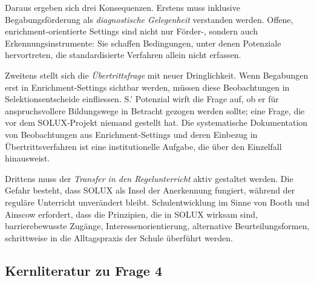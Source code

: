 \documentclass[ngerman, a4paper]{article}
\begin{document}
Daraus ergeben sich drei Konsequenzen. Erstens muss inklusive Begabungsförderung
als \textit{diagnostische Gelegenheit} verstanden werden. Offene, enrichment-orientierte
Settings sind nicht nur Förder-, sondern auch Erkennungsinstrumente: Sie schaffen
Bedingungen, unter denen Potenziale hervortreten, die standardisierte Verfahren
allein nicht erfassen.

Zweitens stellt sich die \textit{Übertrittsfrage} mit neuer Dringlichkeit. Wenn
Begabungen erst in Enrichment-Settings sichtbar werden, müssen diese Beobachtungen
in Selektionsentscheide einfliessen. S.' Potenzial wirft die Frage auf, ob er für
anspruchsvollere Bildungswege in Betracht gezogen werden sollte; eine Frage, die vor
dem SOLUX-Projekt niemand gestellt hat. Die systematische Dokumentation von
Beobachtungen aus Enrichment-Settings und deren Einbezug in Übertrittsverfahren ist
eine institutionelle Aufgabe, die über den Einzelfall hinausweist.

Drittens muss der \textit{Transfer in den Regelunterricht} aktiv gestaltet werden.
Die Gefahr besteht, dass SOLUX als Insel der Anerkennung fungiert, während der
reguläre Unterricht unverändert bleibt. Schulentwicklung im Sinne von Booth und
Ainscow erfordert, dass die Prinzipien, die in SOLUX wirksam sind, barrierebewusste
Zugänge, Interessenorientierung, alternative Beurteilungsformen, schrittweise
in die Alltagspraxis der Schule überführt werden.
 
\subsection{Kernliteratur zu Frage 4}
 
\end{document}
